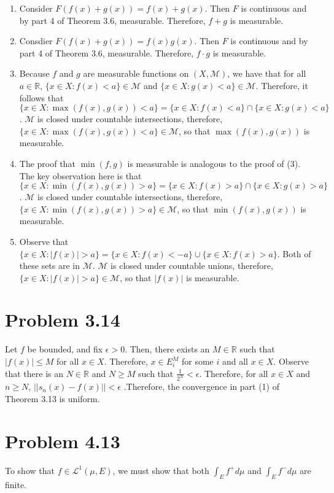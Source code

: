 \documentclass[letterpaper,12pt]{article}
\theoremstyle{definition}
\begin{document}
    \begin{enumerate}
      \item Consider $F(f(x) + g(x)) = f(x) + g(x)$. Then $F$ is continuous and by part 4 of Theorem 3.6, measurable. Therefore, $f + g$ is measurable.
      \item Consdier $F(f(x) + g(x)) = f(x)g(x)$. Then $F$ is continuous and by part 4 of Theorem 3.6, measurable. Therefore, $f \cdot g$ is measurable.
      \item Because $f$ and $g$ are measurable functions on $(X,\mathcal{M})$, we have that for all $a \in \mathbb{R}$, $\{x \in X : f(x) < a \} \in \mathcal{M}$ and $\{x \in X : g(x) < a \} \in \mathcal{M}$. Therefore, it follows that $\{x \in X : \max(f(x),g(x)) < a \} = \{x \in X : f(x) < a \} \cap \{x \in X : g(x) < a \}$. $\mathcal{M}$  is closed under countable intersections, therefore, $\{x \in X : \max(f(x),g(x)) < a \} \in \mathcal{M}$, so that $\max(f(x), g(x))$ is measurable.
      \item The proof that $\min(f,g)$ is measurable is analogous to the proof of (3). The key observation here is that $\{x \in X : \min(f(x),g(x)) > a \} = \{x \in X : f(x) > a \} \cap \{x \in X : g(x) > a \}$. $\mathcal{M}$ is closed under countable intersections, therefore, $\{x \in X : \min(f(x),g(x)) > a \} \in \mathcal{M}$, so that $\min(f(x), g(x))$ is measurable.
      \item Observe that $\{x \in X : |f(x)| > a \} = \{x \in X : f(x) < -a \} \cup \{x \in X : f(x) > a \}$. Both of these sets are in $\mathcal{M}$. $\mathcal{M}$ is closed under countable unions, therefore, $\{x \in X : |f(x)| > a \} \in \mathcal{M}$, so that $|f(x)|$ is measurable.
    \end{enumerate}

    \section*{Problem 3.14}

     Let $f$ be bounded, and fix $\epsilon > 0$. Then, there exists an $M \in \mathbb{R}$ such that $|f(x)| \leq M$ for all $x \in X$. Therefore, $x \in E^M_i$ for some $i$ and all $x \in X$. Observe that there is an $N \in \mathbb{R}$ and $N \geq M$ such that $\frac{1}{2^N} < \epsilon$. Therefore, for all $x \in X$ and $n \geq N$, $|| s_n(x) - f(x) || < \epsilon$
    .Therefore, the convergence in part (1) of Theorem 3.13 is uniform.

\newpage

    \section*{Problem 4.13}
    To show that $f \in \mathscr{L}^{1}(\mu, E)$, we must show that both $\int_E f^+ d \mu$ and $\int_E f^- d \mu$ are finite.
\end{document}
